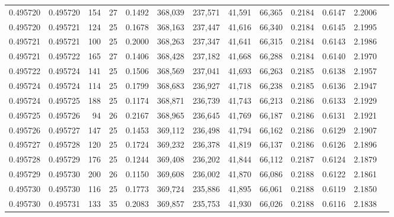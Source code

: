 \begin{tabular}{rrrrrrrrrrrrr}
0.495720 & 0.495720 & 154 &  27 &                                     0.1492 & 368,039 & 237,571 &  41,591 &  66,365 & 0.2184 & 0.6147 & 2.2006 \\
0.495720 & 0.495721 & 124 &  25 &                                     0.1678 & 368,163 & 237,447 &  41,616 &  66,340 & 0.2184 & 0.6145 & 2.1995 \\
0.495721 & 0.495721 & 100 &  25 &                                     0.2000 & 368,263 & 237,347 &  41,641 &  66,315 & 0.2184 & 0.6143 & 2.1986 \\
0.495721 & 0.495722 & 165 &  27 &                                     0.1406 & 368,428 & 237,182 &  41,668 &  66,288 & 0.2184 & 0.6140 & 2.1970 \\
0.495722 & 0.495724 & 141 &  25 &                                     0.1506 & 368,569 & 237,041 &  41,693 &  66,263 & 0.2185 & 0.6138 & 2.1957 \\
0.495724 & 0.495724 & 114 &  25 &                                     0.1799 & 368,683 & 236,927 &  41,718 &  66,238 & 0.2185 & 0.6136 & 2.1947 \\
0.495724 & 0.495725 & 188 &  25 &                                     0.1174 & 368,871 & 236,739 &  41,743 &  66,213 & 0.2186 & 0.6133 & 2.1929 \\
0.495725 & 0.495726 &  94 &  26 &                                     0.2167 & 368,965 & 236,645 &  41,769 &  66,187 & 0.2186 & 0.6131 & 2.1921 \\
0.495726 & 0.495727 & 147 &  25 &                                     0.1453 & 369,112 & 236,498 &  41,794 &  66,162 & 0.2186 & 0.6129 & 2.1907 \\
0.495727 & 0.495728 & 120 &  25 &                                     0.1724 & 369,232 & 236,378 &  41,819 &  66,137 & 0.2186 & 0.6126 & 2.1896 \\
0.495728 & 0.495729 & 176 &  25 &                                     0.1244 & 369,408 & 236,202 &  41,844 &  66,112 & 0.2187 & 0.6124 & 2.1879 \\
0.495729 & 0.495730 & 200 &  26 &                                     0.1150 & 369,608 & 236,002 &  41,870 &  66,086 & 0.2188 & 0.6122 & 2.1861 \\
0.495730 & 0.495730 & 116 &  25 &                                     0.1773 & 369,724 & 235,886 &  41,895 &  66,061 & 0.2188 & 0.6119 & 2.1850 \\
0.495730 & 0.495731 & 133 &  35 &                                     0.2083 & 369,857 & 235,753 &  41,930 &  66,026 & 0.2188 & 0.6116 & 2.1838 \\

\end{tabular}
